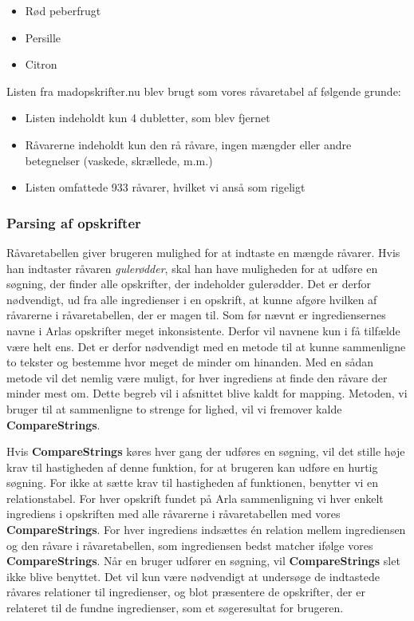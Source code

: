 \begin{itemize}
\item Rød peberfrugt
\item Persille
\item Citron
\end{itemize}

Listen fra madopskrifter.nu blev brugt som vores råvaretabel af følgende grunde:

\begin{itemize}
\item Listen indeholdt kun 4 dubletter, som blev fjernet
\item Råvarerne indeholdt kun den rå råvare, ingen mængder eller andre betegnelser (vaskede, skrællede, m.m.)
\item Listen omfattede 933 råvarer, hvilket vi anså som rigeligt
\end{itemize}

\subsubsection{Parsing af opskrifter}
Råvaretabellen giver brugeren mulighed for at indtaste en mængde råvarer. Hvis han indtaster råvaren \textit{gulerødder}, skal han have muligheden for at udføre en søgning, der finder alle opskrifter, der indeholder gulerødder. Det er derfor nødvendigt, ud fra alle ingredienser i en opskrift, at kunne afgøre hvilken af råvarerne i råvaretabellen, der er magen til. Som før nævnt er ingrediensernes navne i Arlas opskrifter meget inkonsistente. Derfor vil navnene kun i få tilfælde være helt ens. Det er derfor nødvendigt med en metode til at kunne sammenligne to tekster og bestemme hvor meget de minder om hinanden. Med en sådan metode vil det nemlig være muligt, for hver ingrediens at finde den råvare der minder mest om. Dette begreb vil i afsnittet blive kaldt for mapping. Metoden, vi bruger til at sammenligne to strenge for lighed, vil vi fremover kalde \textbf{CompareStrings}.

Hvis \textbf{CompareStrings} køres hver gang der udføres en søgning, vil det stille høje krav til hastigheden af denne funktion, for at brugeren kan udføre en hurtig søgning. For ikke at sætte krav til hastigheden af funktionen, benytter vi en relationstabel. For hver opskrift fundet på Arla sammenligning vi hver enkelt ingrediens i opskriften med alle råvarerne i råvaretabellen med vores \textbf{CompareStrings}. For hver ingrediens indsættes én relation mellem ingrediensen og den råvare i råvaretabellen, som ingrediensen bedst matcher ifølge vores \textbf{CompareStrings}. Når en bruger udfører en søgning, vil \textbf{CompareStrings} slet ikke blive benyttet. Det vil kun være nødvendigt at undersøge de indtastede råvares relationer til ingredienser, og blot præsentere de opskrifter, der er relateret til de fundne ingredienser, som et søgeresultat for brugeren.


